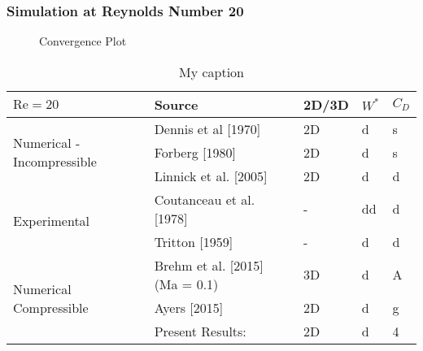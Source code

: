 	\subsubsection{Simulation at Reynolds Number 20}
	\begin{figure}[htp]	
		\centering
		\label{shivfjftersaror}	
		\caption{Convergence Plot}
	\end{figure}
\begin{table}[]
	\centering
	\caption{My caption}
	\label{my-label}
	\begin{tabular}{|l|l|l|l|l|}
		\hline
		$\text{Re}=20$                              & Source                             & 2D/3D & $W^*$ & $C_D$ \\ \hline
		\multirow{3}{*}{Numerical - Incompressible} & Dennis et al {[}1970{]}            & 2D    & d     & s     \\ \cline{2-5} 
		& Forberg {[}1980{]}                 & 2D    & d     & s     \\ \cline{2-5} 
		& Linnick et al. {[}2005{]}          & 2D    & d     & d     \\ \hline
		\multirow{2}{*}{Experimental}               & Coutanceau et al. {[}1978{]}       & -     & dd    & d     \\ \cline{2-5} 
		& Tritton {[}1959{]}                 & -     & d     & d     \\ \hline
		\multirow{3}{*}{Numerical Compressible}     & Brehm et al. {[}2015{]} (Ma = 0.1) & 3D    & d     & A     \\ \cline{2-5} 
		& Ayers {[}2015{]}                   & 2D    & d     & g     \\ \cline{2-5} 
		& Present Results:                   & 2D    & d     & 4     \\ \hline
	\end{tabular}
\end{table}
	
